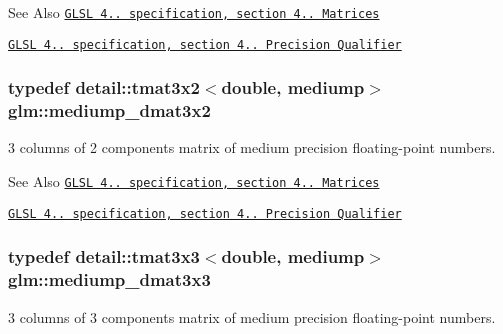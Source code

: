 \begin{DoxySeeAlso}{See Also}
\href{http://www.opengl.org/registry/doc/GLSLangSpec.4.20.8.pdf}{\tt G\-L\-S\-L 4.. specification, section 4.. Matrices} 

\href{http://www.opengl.org/registry/doc/GLSLangSpec.4.20.8.pdf}{\tt G\-L\-S\-L 4.. specification, section 4.. Precision Qualifier} 
\end{DoxySeeAlso}
\hypertarget{group__core__precision_gaff0060984716bcda68ff69ed27536bf6}{
\subsubsection[{mediump\-\_\-dmat3x2}]{\setlength{\rightskip}{0pt plus 5cm}typedef detail\-::tmat3x2$<$double, mediump$>$ {\bf glm\-::mediump\-\_\-dmat3x2}}}\label{group__core__precision_gaff0060984716bcda68ff69ed27536bf6}
3 columns of 2 components matrix of medium precision floating-\/point numbers.

\begin{DoxySeeAlso}{See Also}
\href{http://www.opengl.org/registry/doc/GLSLangSpec.4.20.8.pdf}{\tt G\-L\-S\-L 4.. specification, section 4.. Matrices} 

\href{http://www.opengl.org/registry/doc/GLSLangSpec.4.20.8.pdf}{\tt G\-L\-S\-L 4.. specification, section 4.. Precision Qualifier} 
\end{DoxySeeAlso}
\hypertarget{group__core__precision_ga2f73508d8192390ca9f9b569f544fade}{
\subsubsection[{mediump\-\_\-dmat3x3}]{\setlength{\rightskip}{0pt plus 5cm}typedef detail\-::tmat3x3$<$double, mediump$>$ {\bf glm\-::mediump\-\_\-dmat3x3}}}\label{group__core__precision_ga2f73508d8192390ca9f9b569f544fade}
3 columns of 3 components matrix of medium precision floating-\/point numbers.

